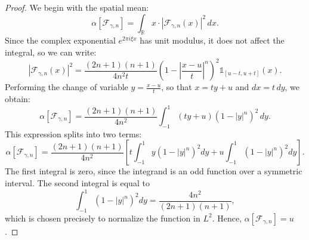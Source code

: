\documentclass[preprint,hidelinks,authoryear]{elsarticle}
\theoremstyle{plain}
\theoremstyle{definition}
\theoremstyle{remark}
\begin{document}
\begin{proof}
We begin with the spatial mean:
$$
\alpha[\mathcal{F}_{\gamma,n}] = \int_{\mathbb{R}} x \cdot |\mathcal{F}_{\gamma,n}(x)|^2 \, dx.
$$
Since the complex exponential $ e^{2\pi i \xi x} $ has unit modulus, it does not affect the integral, so we can write:
\begin{equation}
\label{eq:F2}
|\mathcal{F}_{\gamma,n}(x)|^2 = \frac{(2n+1)(n+1)}{4n^2 t} \left(1 - \left| \frac{x - u}{t} \right|^n \right)^2 \mathds{1}_{[u - t, u + t]}(x).
\end{equation}
Performing the change of variable $ y = \frac{x - u}{t} $, so that $ x = ty + u $ and $ dx = t\,dy $, we obtain:
$$
\alpha[\mathcal{F}_{\gamma,n}] = \frac{(2n+1)(n+1)}{4n^2} \int_{-1}^{1} (ty + u) \left(1 - |y|^n \right)^2 \, dy.
$$
This expression splits into two terms:
$$
\alpha[\mathcal{F}_{\gamma,n}] = \frac{(2n+1)(n+1)}{4n^2} \left[ t \int_{-1}^{1} y \left(1 - |y|^n \right)^2 dy + u \int_{-1}^{1} \left(1 - |y|^n \right)^2 dy \right].
$$
The first integral is zero, since the integrand is an odd function over a symmetric interval. The second integral is equal to
$$
\int_{-1}^{1} \left(1 - |y|^n \right)^2 dy = \frac{4n^2}{(2n+1)(n+1)},
$$
which is chosen precisely to normalize the function in $ L^2 $. Hence, $\alpha[\mathcal{F}_{\gamma,n}] = u$.


\end{proof}
\end{document}
